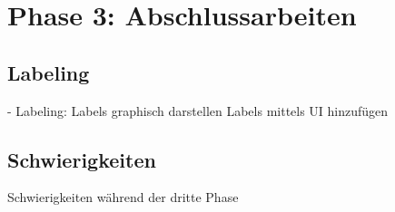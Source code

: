 \section{Phase 3: Abschlussarbeiten}

\subsection{Labeling}
- Labeling:
Labels graphisch darstellen
Labels mittels UI hinzufügen

\subsection{Schwierigkeiten}
Schwierigkeiten während der dritte Phase